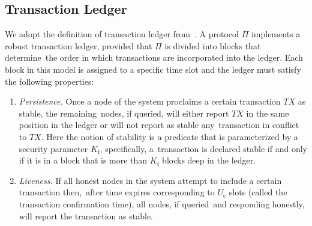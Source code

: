 \subsection{Transaction Ledger}\label{subsec:transaction-ledger.}
We adopt the definition of transaction ledger from~\cite{cryptoeprint:2016/889}.
A protocol $\Pi$ implements a robust transaction ledger, provided that $\Pi$ is divided into blocks that determine\
the order in which transactions are incorporated into the ledger.
Each block in this model is assigned to a specific time slot and the ledger must satisfy the following properties:
\begin{enumerate}
    \item \emph{Persistence.} Once a node of the system proclaims a certain transaction $TX$ as stable, the remaining\
    nodes, if queried, will either report $TX$ in the same position in the ledger or will not report as stable any\
    transaction in conflict to $TX$.
    Here the notion of stability is a predicate that is parameterized by a security parameter $K_{\text{f}}$, specifically, a\
    transaction is declared stable if and only if it is in a block that is more than $K_{\text{f}}$ blocks deep in the ledger.
    \item \emph{Liveness.} If all honest nodes in the system attempt to include a certain transaction then,\
    after time expires corresponding to $U_{\text{c}}$ slots (called the transaction confirmation time), all nodes, if queried\
    and responding honestly, will report the transaction as stable.
\end{enumerate}
